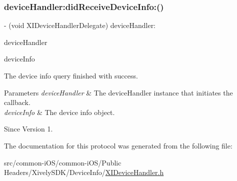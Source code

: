 \subsubsection{\texorpdfstring{device\+Handler\+:did\+Receive\+Device\+Info\+:()}{deviceHandler:didReceiveDeviceInfo:()}}
{\footnotesize\ttfamily -\/ (void X\+I\+Device\+Handler\+Delegate) device\+Handler\+: \begin{DoxyParamCaption}\item[{(id$<$ X\+I\+Device\+Handler $>$)}]{device\+Handler }\item[{didReceiveDeviceInfo:(\hyperlink{class_x_i_device_info}{X\+I\+Device\+Info} $\ast$)}]{device\+Info }\end{DoxyParamCaption}}



The device info query finished with success. 


\begin{DoxyParams}{Parameters}
{\em device\+Handler} & The device\+Handler instance that initiates the callback. \\
\hline
{\em device\+Info} & The device info object. \\
\hline
\end{DoxyParams}
\begin{DoxySince}{Since}
Version 1. 
\end{DoxySince}


The documentation for this protocol was generated from the following file\+:\begin{DoxyCompactItemize}
\item 
src/common-\/i\+O\+S/common-\/i\+O\+S/\+Public Headers/\+Xively\+S\+D\+K/\+Device\+Info/\hyperlink{_x_i_device_handler_8h}{X\+I\+Device\+Handler.\+h}\end{DoxyCompactItemize}
